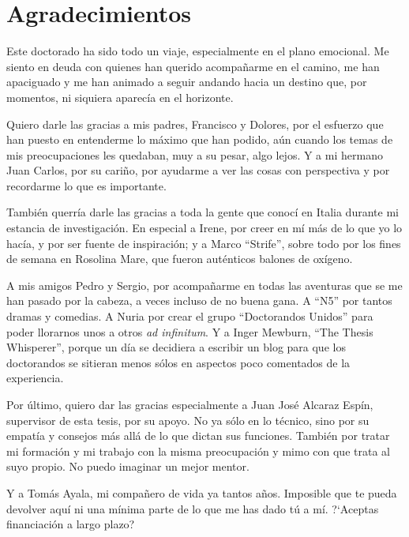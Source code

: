 \section*{Agradecimientos}
Este doctorado ha sido todo un viaje, especialmente en el plano emocional. Me siento en deuda con quienes han querido acompa\~{n}arme en el camino, me han apaciguado y me han animado a seguir andando hacia un destino que, por momentos, ni siquiera aparec\'{i}a en el horizonte.

Quiero darle las gracias a mis padres, Francisco y Dolores, por el esfuerzo que han puesto en entenderme lo m\'{a}ximo que han podido, a\'{u}n cuando los temas de mis preocupaciones les quedaban, muy a su pesar, algo lejos. Y a mi hermano Juan Carlos, por su cari\~{n}o, por ayudarme a ver las cosas con perspectiva y por recordarme lo que es importante. 

También querr\'{i}a darle las gracias a toda la gente que conoc\'{i} en Italia durante mi estancia de investigaci\'{o}n. En especial a Irene, por creer en m\'{i} m\'{a}s de lo que yo lo hac\'{i}a, y por ser fuente de inspiraci\'{o}n; y a Marco \enquote{Strife}, sobre todo por los fines de semana en Rosolina Mare, que fueron aut\'{e}nticos balones de ox\'{i}geno. 

A mis amigos Pedro y Sergio, por acompa\~{n}arme en todas las aventuras que se me han pasado por la cabeza, a veces incluso de no buena gana. A \enquote{N5} por tantos dramas y comedias. A Nuria por crear el grupo \enquote{Doctorandos Unidos} para poder llorarnos unos a otros \textit{ad infinitum}. Y a Inger Mewburn, \enquote{The Thesis Whisperer}, porque un d\'{i}a se decidiera a escribir un blog para que los doctorandos se sitieran menos s\'{o}los en aspectos poco comentados de la experiencia. 

Por \'{u}ltimo, quiero dar las gracias especialmente a Juan Jos\'{e} Alcaraz Esp\'{i}n, supervisor de esta tesis, por su apoyo. No ya s\'{o}lo en lo t\'{e}cnico, sino por su empat\'{i}a y consejos m\'{a}s all\'{a} de lo que dictan sus funciones. Tambi\'{e}n por tratar mi formaci\'{o}n y mi trabajo con la misma preocupaci\'{o}n y mimo con que trata al suyo propio. No puedo imaginar un mejor mentor. 

Y a Tom\'{a}s Ayala, mi compa\~{n}ero de vida ya tantos a\~{n}os. Imposible que te pueda devolver aqu\'{i} ni una m\'{i}nima parte de lo que me has dado t\'{u} a m\'{i}. ?`Aceptas financiaci\'{o}n a largo plazo? 

